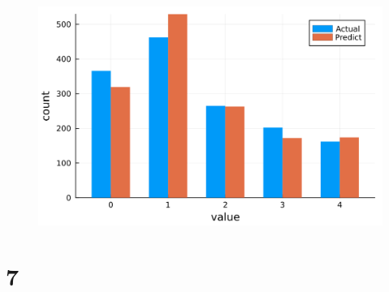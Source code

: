 \documentclass[
  letterpaper,
  DIV=11,
  numbers=noendperiod]{scrreprt}
\begin{document}
\begin{figure}[H]

{\centering \includegraphics{./entry_exit_application_files/figure-pdf/cell-16-output-1.svg}

}

\end{figure}

\hypertarget{section-26}{%
\section{7}\label{section-26}}
\end{document}

